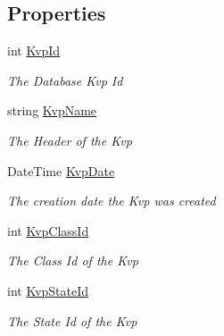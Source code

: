 \subsection*{Properties}
\begin{DoxyCompactItemize}
\item 
int \hyperlink{classkpi_mvc_api_1_1_data_transfer_objects_1_1_kvp_data_dto_a2ee81b94a63640c4d6202c7a4f360a52}{Kvp\+Id}
\begin{DoxyCompactList}\small\item\em The Database Kvp Id \end{DoxyCompactList}\item 
string \hyperlink{classkpi_mvc_api_1_1_data_transfer_objects_1_1_kvp_data_dto_aa586d4ee7eeb51ee56ef6af626aed6d2}{Kvp\+Name}
\begin{DoxyCompactList}\small\item\em The Header of the Kvp \end{DoxyCompactList}\item 
Date\+Time \hyperlink{classkpi_mvc_api_1_1_data_transfer_objects_1_1_kvp_data_dto_a4dde28c5eb6a5bc0ef30432789137525}{Kvp\+Date}
\begin{DoxyCompactList}\small\item\em The creation date the Kvp was created \end{DoxyCompactList}\item 
int \hyperlink{classkpi_mvc_api_1_1_data_transfer_objects_1_1_kvp_data_dto_a986c84b6d185a7501cf9c7dc90821fb7}{Kvp\+Class\+Id}
\begin{DoxyCompactList}\small\item\em The Class Id of the Kvp \end{DoxyCompactList}\item 
int \hyperlink{classkpi_mvc_api_1_1_data_transfer_objects_1_1_kvp_data_dto_a6b16dcff1253d2fa4574a7fde4cdb11c}{Kvp\+State\+Id}
\begin{DoxyCompactList}\small\item\em The State Id of the Kvp \end{DoxyCompactList}\item 

\end{DoxyCompactItemize}
